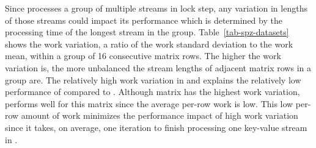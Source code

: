 
Since  processes a group of multiple streams in lock step, any
variation in lengths of those streams could impact its performance which is
determined by the processing time of the longest stream in the group.
Table~\ref{tab-spz-datasets} shows the work variation, a ratio of the work
standard deviation to the work mean, within a group of 16 consecutive matrix
rows.
The higher the work variation is, the more unbalanced the stream lengths of
adjacent matrix rows in a group are.
The relatively high work variation in  and  explains the
relatively low performance of  compared to .
Although matrix  has the highest work variation, 
performs well for this matrix since the average per-row work is low.
This low per-row amount of work minimizes the performance impact of high work
variation since it takes, on average, one iteration to finish processing one
key-value stream in .


